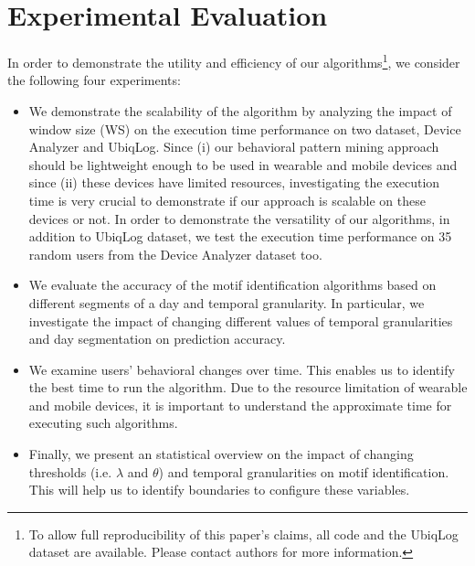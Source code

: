 \documentclass{sig-alternate}
\begin{document}
\section{Experimental Evaluation}
In order to demonstrate the utility and efficiency of our algorithms\footnote{\small{To allow full reproducibility of this paper's claims, all code and the UbiqLog dataset are available. Please contact authors for more information.}}, we consider the following four experiments:
\vspace{-0.2cm}
\begin{itemize}\itemsep1pt \parskip0pt 
\item{We demonstrate the scalability of the algorithm by analyzing the impact of window size (WS) on the execution time performance on two dataset, Device Analyzer and UbiqLog. Since (i) our behavioral pattern mining approach should be lightweight enough to be used in wearable and mobile devices and since (ii) these devices have limited resources, investigating the execution time is very crucial to demonstrate if our approach is scalable on these devices or not. In order to demonstrate the versatility of our algorithms, in addition to UbiqLog dataset, we test the execution time performance on 35 random users from the Device Analyzer dataset too.}
\item{We evaluate the accuracy of the motif identification algorithms based on different segments of a day and temporal granularity. In particular, we investigate the impact of changing different values of temporal granularities and day segmentation on prediction accuracy.}
\item{We examine users' behavioral changes over time. This enables us to identify the best time to run the algorithm. Due to the resource limitation of wearable and mobile devices, it is important to understand the approximate time for executing such algorithms.}
\item{Finally, we present an statistical overview on the impact of changing thresholds (i.e. $\lambda$ and $\theta$) and temporal granularities on motif identification. This will help us to identify boundaries to configure these variables.}
\end{itemize}
\vspace{-0.2cm}
\end{document}
